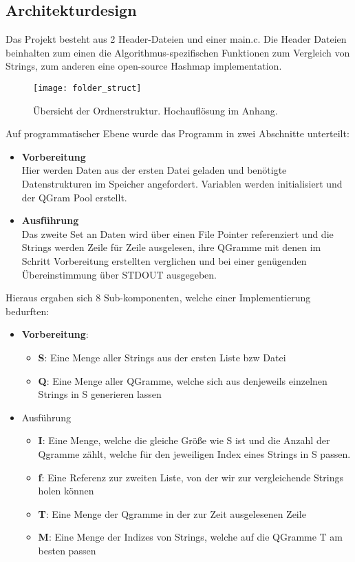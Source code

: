 \subsection{Architekturdesign}
Das Projekt besteht aus 2 Header-Dateien und einer main.c. Die Header Dateien
beinhalten zum einen die Algorithmus-spezifischen Funktionen zum Vergleich von
Strings, zum anderen eine open-source Hashmap implementation.

\begin{figure}[!htp]
	\label{folderstruct}
	\caption{Übersicht der Ordnerstruktur. Hochauflösung im Anhang.}
	\texttt{[image: folder\_struct]}
\end{figure}

Auf programmatischer Ebene wurde das Programm in zwei Abschnitte unterteilt:
\begin{itemize}
    \item \textbf{Vorbereitung} \\
    Hier werden Daten aus der ersten Datei geladen und benötigte Datenstrukturen im Speicher angefordert.
    Variablen werden initialisiert und der QGram Pool erstellt.
    \item \textbf{Ausführung} \\
    Das zweite Set an Daten wird über einen File Pointer referenziert und die
    Strings werden Zeile für Zeile ausgelesen, ihre QGramme mit denen im Schritt
    Vorbereitung erstellten verglichen und bei einer genügenden Übereinstimmung
    über STDOUT ausgegeben.
\end{itemize}

Hieraus ergaben sich 8 Sub-komponenten, welche einer Implementierung bedurften:


\begin{itemize}
    \item \textbf{Vorbereitung}:
    \begin{itemize}
        \item \textbf{S}: Eine Menge aller Strings aus der ersten Liste bzw Datei
        \item \textbf{Q}: Eine Menge aller QGramme, welche sich aus denjeweils einzelnen Strings in S generieren lassen
    \end{itemize}

    \item Ausführung
    \begin{itemize}
        \item \textbf{I}: Eine Menge, welche die gleiche Größe wie S ist und die
        Anzahl der Qgramme zählt, welche für den jeweiligen Index eines Strings in
        S passen.
        \item \textbf{f}: Eine Referenz zur zweiten Liste, von der wir zur vergleichende
        Strings holen können
        \item \textbf{T}: Eine Menge der Qgramme in der zur Zeit ausgelesenen Zeile
        \item \textbf{M}: Eine Menge der Indizes von Strings, welche auf die QGramme
        T am besten passen
    \end{itemize}
\end{itemize}

